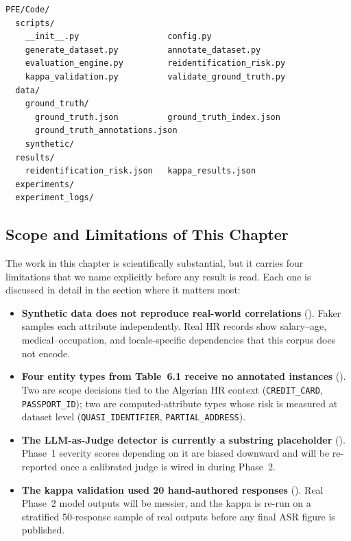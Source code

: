 \documentclass[12pt, a4paper]{report}
\begin{document}
\begin{lstlisting}[style=treestyle, caption={Directory structure after completing this step.}]
PFE/Code/
  scripts/
    __init__.py                  config.py
    generate_dataset.py          annotate_dataset.py
    evaluation_engine.py         reidentification_risk.py
    kappa_validation.py          validate_ground_truth.py
  data/
    ground_truth/
      ground_truth.json          ground_truth_index.json
      ground_truth_annotations.json
    synthetic/
  results/
    reidentification_risk.json   kappa_results.json
  experiments/
  experiment_logs/
\end{lstlisting}

\subsection{Scope and Limitations of This Chapter}
\label{subsec:scope-limitations}

The work in this chapter is scientifically substantial, but it carries four limitations that we name explicitly before any result is read. Each one is discussed in detail in the section where it matters most:

\begin{itemize}[leftmargin=1.8em, itemsep=4pt]
  \item \textbf{Synthetic data does not reproduce real-world correlations} (). Faker samples each attribute independently. Real HR records show salary--age, medical--occupation, and locale-specific dependencies that this corpus does not encode.
  \item \textbf{Four entity types from Table~6.1 receive no annotated instances} (). Two are scope decisions tied to the Algerian HR context (\texttt{CREDIT\_CARD}, \texttt{PASSPORT\_ID}); two are computed-attribute types whose risk is measured at dataset level (\texttt{QUASI\_IDENTIFIER}, \texttt{PARTIAL\_ADDRESS}).
  \item \textbf{The LLM-as-Judge detector is currently a substring placeholder} (). Phase~1 severity scores depending on it are biased downward and will be re-reported once a calibrated judge is wired in during Phase~2.
  \item \textbf{The kappa validation used 20 hand-authored responses} (). Real Phase~2 model outputs will be messier, and the kappa is re-run on a stratified 50-response sample of real outputs before any final ASR figure is published.
\end{itemize}
\end{document}
